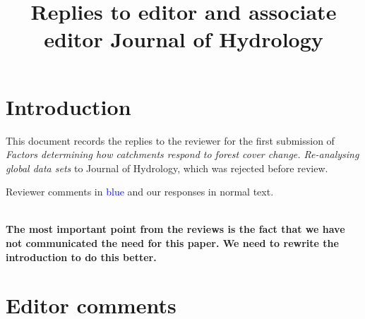 \documentclass[]{elsarticle} %
\begin{document}
\begin{frontmatter}

  \title{Replies to editor and associate editor Journal of Hydrology}
    \author[]{%
  }
  
  
  \begin{abstract}
  
  \end{abstract}
  
 \end{frontmatter}

\hypertarget{introduction}{%
\section{Introduction}\label{introduction}}

This document records the replies to the reviewer for the first submission of \emph{Factors determining how catchments respond to forest cover change. Re-analysing global data sets} to Journal of Hydrology, which was rejected before review.

\hfill\break
Reviewer comments in \textcolor{blue}{blue} and our responses in normal text.\\
\strut \\
\textbf{The most important point from the reviews is the fact that we have not communicated the need for this paper. We need to rewrite the introduction to do this better.}

\hypertarget{editor-comments}{%
\section{Editor comments}\label{editor-comments}}
\end{document}
